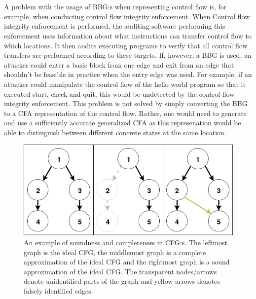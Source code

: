 \documentclass{kththesis}
\begin{document}
\\ \\
A problem with the usage of BBG:s when representing control flow is, for example, when conducting control flow integrity enforcement\cite{CFIEnforcement}. When Control flow integrity enforcement is performed, the auditing software performing this enforcement uses information about what instructions can transfer control flow to which locations. It then audits executing programs to verify that all control flow transfers are performed according to these targets. If, however, a BBG is used, an attacker could enter a basic block from one edge and exit from an edge that shouldn't be feasible in practice when the entry edge was used. For example, if an attacker could manipulate the control flow of the hello world program so that it executed start, check and quit, this would be undetected by the control flow integrity enforcement. This problem is not solved by simply converting the BBG to a CFA representation of the control flow. Rather, one would need to generate and use a sufficiently accurate generalized CFA as this represenation would be able to distinguish between different concrete states at the same location.
\begin{figure}[th]
    \centering
    \includegraphics[scale=0.6]{Images/SoundCompleteGraph.png}
    \caption[An example of soundness and completeness in CFG:s.]{An example of soundness and completeness in CFG:s. The leftmost graph is the ideal CFG, the middlemost graph is a complete approximation of the ideal CFG and the rightmost graph is a sound approximation of the ideal CFG. The transparent nodes/arrows denote unidentified parts of the graph and yellow arrows denotes falsely identified edges.}
    \label{fig:SoundCompleteGraph}
\end{figure}
\end{document}
